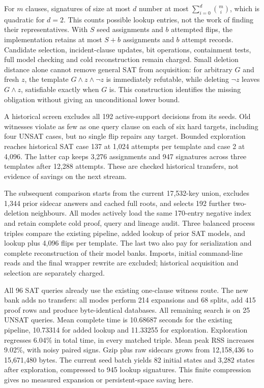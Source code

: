 \documentclass[11pt,a4paper]{article}
\numberwithin{equation}{section}
\theoremstyle{plain}
\theoremstyle{definition}
\theoremstyle{remark}
\begin{document}
For $m$ clauses, signatures of size at most $d$ number at most
$\sum_{i=0}^{d}\binom{m}{i}$, which is quadratic for $d=2$. This counts possible
lookup entries, not the work of finding their representatives. With $S$ seed
assignments and $b$ attempted flips, the implementation retains at most $S+b$
assignments and $b$ attempt records. Candidate selection, incident-clause updates,
bit operations, containment tests, full model checking and cold reconstruction
remain charged. Small deletion distance alone cannot remove general SAT from
acquisition: for arbitrary $G$ and fresh $z$, the template
$G\land z\land\neg z$ is immediately refutable, while deleting $\neg z$ leaves
$G\land z$, satisfiable exactly when $G$ is. This construction identifies the
missing obligation without giving an unconditional lower bound.

A historical screen excludes all 192 active-support decisions from its seeds.
Old witnesses violate as few as one query clause on each of six hard targets,
including four UNSAT cases, but no single flip repairs any target. Bounded
exploration reaches historical SAT case 137 at 1,024 attempts per template and
case 2 at 4,096. The latter cap keeps 3,276 assignments and 947 signatures across
three templates after 12,288 attempts. These are checked historical transfers,
not evidence of savings on the next stream.

The subsequent comparison starts from the current 17,532-key union, excludes
1,344 prior sidecar answers and cached full roots, and selects 192 further
two-deletion neighbours. All modes actively load the same 170-entry negative
index and retain complete cold proof, query and lineage audit. Three balanced
process triples compare the existing pipeline, added lookup of prior SAT models,
and lookup plus 4,096 flips per template. The last two also pay for serialization
and complete reconstruction of their model banks. Imports, initial command-line
reads and the final wrapper rewrite are excluded; historical acquisition and
selection are separately charged.

All 96 SAT queries already use the existing one-clause witness route. The new
bank adds no transfers: all modes perform 214 expansions and 68 splits, add 415
proof rows and produce byte-identical databases. All remaining search is on
25 UNSAT queries. Mean complete time is 10.68687 seconds for the existing
pipeline, 10.73314 for added lookup and 11.33255 for exploration. Exploration
regresses 6.04\% in total time, in every matched triple. Mean peak RSS increases
9.02\%, with noisy paired signs. Gzip plus raw sidecars grows from 12,158,436
to 15,671,480 bytes. The current seed batch yields 82 initial states and 3,282
states after exploration, compressed to 945 lookup signatures. This finite
compression gives no measured expansion or persistent-space saving here.
\end{document}
